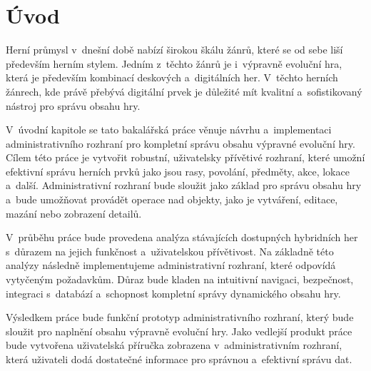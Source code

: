 \chapter{Úvod}
\label{ch:introduction}

Herní průmysl v~dnešní době nabízí širokou škálu žánrů, které se od sebe liší především herním stylem. Jedním z~těchto žánrů je i~výpravně evoluční hra, která je především kombinací deskových a~digitálních her. V~těchto herních žánrech, kde právě přebývá digitální prvek je důležité mít kvalitní a~sofistikovaný nástroj pro správu obsahu hry.

V~úvodní kapitole se tato bakalářská práce věnuje návrhu a~implementaci administrativního rozhraní pro kompletní správu obsahu výpravné evoluční hry. Cílem této práce je vytvořit robustní, uživatelsky přívětivé rozhraní, které umožní efektivní správu herních prvků jako jsou rasy, povolání, předměty, akce, lokace a~další. Administrativní rozhraní bude sloužit jako základ pro správu obsahu hry a~bude umožňovat provádět operace nad objekty, jako je vytváření, editace, mazání nebo zobrazení detailů.

V~průběhu práce bude provedena analýza stávajících dostupných hybridních her s~důrazem na jejich funkčnost a~uživatelskou přívětivost. Na základně této analýzy následně implementujeme administrativní rozhraní, které odpovídá vytyčeným požadavkům. Důraz bude kladen na intuitivní navigaci, bezpečnost, integraci s~databází a~schopnost kompletní správy dynamického obsahu hry.

Výsledkem práce bude funkční prototyp administrativního rozhraní, který bude sloužit pro naplnění obsahu výpravně evoluční hry. Jako vedlejší produkt práce bude vytvořena uživatelská příručka zobrazena v~administrativním rozhraní, která uživateli dodá dostatečné informace pro správnou a~efektivní správu dat.

\endinput